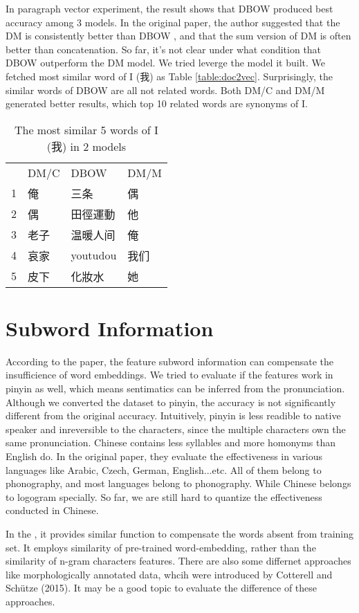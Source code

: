 In paragraph vector experiment, the result shows that DBOW produced best accuracy among 3 models. In the original paper, the author suggested that the DM is consistently better than DBOW
, and that the sum version of DM is often better than concatenation. 
So far, it's not clear under what condition that DBOW outperform the DM model. We tried leverge the model it built. 
We fetched most similar word of I (我) as Table \ref{table:doc2vec}. Surprisingly, the similar words of DBOW are all not related words. 
Both DM/C and DM/M generated better results, which top 10 related words are synonyms of I.

\begin{table}[]
\centering
\caption{The most similar 5 words of I (我) in 2 models}
\label{doc2vec}
\begin{tabular}{llll}
      & DM/C & DBOW & DM/M \\
1 & 俺 &  三条  & 偶\\
2 & 偶  & 田徑運動 & 他\\
3 & 老子  & 温暖人间 & 俺\\
4 & 哀家  & youtudou & 我们\\
5 & 皮下  & 化妝水 & 她
\end{tabular}
\end{table}

\section{Subword Information}

According to the paper, the feature subword information can compensate the insufficience of word embeddings. 
We tried to evaluate if the features work in pinyin as well, which means sentimatics can be inferred from the pronunciation. 
Although we converted the dataset to pinyin, the accuracy is not significantly different from the original accuracy. 
Intuitively, pinyin is less readible to native speaker and inreversible to the characters, since the multiple characters own the same pronunciation. 
Chinese contains less syllables and more homonyms than English do. In the original paper\cite{bojanowski2016enriching}, they evaluate the effectiveness in various languages like Arabic, Czech, German, English...etc.
All of them belong to phonography, and most languages belong to phonography. While Chinese belongs to logogram specially. So far, we are still hard to quantize the effectiveness conducted in Chinese.

In the \cite{DBLP:journals/corr/MikolovLS13}, it provides similar function to compensate the words absent from training set. 
It employs similarity of pre-trained word-embedding, rather than the similarity of n-gram characters features. 
There are also some differnet approaches like morphologically annotated data, whcih were introduced by Cotterell and Schütze (2015).
It may be a good topic to evaluate the difference of these approaches. 

